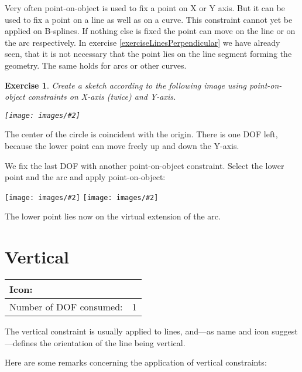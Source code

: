 \documentclass[12pt,titlepage]{article}
\newcommand{\icon}[1]{\raisebox{-1em}{\rule{0pt}{27pt}\texttt{[image: images/\#1]}}}
\newcommand{\img}[2]{\vspace{2ex}\noindent\texttt{[image: images/\#2]}}
\newcommand{\dofConsumed}{Number of DOF consumed:}
\newtheorem{Exercise}{Exercise}
\begin{document}
Very often point-on-object is used to fix a point on X or Y axis. But it can be used
to fix a point on a line as well as on a curve. This constraint cannot yet be applied
on B-splines. If nothing else is fixed the point can move on the line or on the arc
respectively.
In exercise \vref{exerciseLinesPerpendicular} we have already seen, that it is not
necessary that the point lies on the line segment forming the geometry. The same
holds for arcs or other curves.

\begin{Exercise}
Create a sketch according to the following image using point-on-object constraints on
X-axis (twice) and Y-axis.

\img{}{PointOnLine1}
\end{Exercise}

The center of the circle is coincident with the origin. There is one DOF left,
because the lower point can move freely up and down the Y-axis.

We fix the last DOF with another point-on-object constraint. Select the lower point
and the arc and apply point-on-object:

\img{height=5cm}{PointOnLine2}
\hspace{1cm}
\raisebox{2cm}{$\stackrel{\icon{Constraint_PointOnObject}}{\longrightarrow}$}
\hspace{1cm}
\img{height=5cm}{PointOnLine3}

The lower point lies now on the virtual extension of the arc.


\section{Vertical}
\label{Vertical}
\begin{tabular}{|l|l|}
\hline
Icon: & \icon{Constraint_Vertical}\\
\hline
\dofConsumed & 1 \\
\hline
\end{tabular}

The vertical constraint is usually applied to lines, and---as name and icon
suggest---defines the orientation of the line being vertical.

Here are some remarks concerning the application of vertical constraints:
\end{document}
